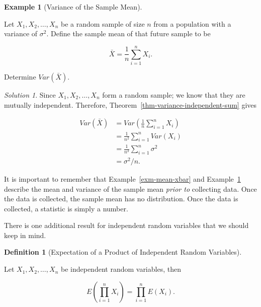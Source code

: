 \documentclass[
  letterpaper,
  DIV=11,
  numbers=noendperiod]{scrreprt}
\theoremstyle{definition}
\newtheorem{definition}{Definition}[chapter]
\theoremstyle{plain}
\theoremstyle{definition}
\newtheorem{example}{Example}[chapter]
\theoremstyle{remark}
\newtheorem*{solution}{Solution}
\begin{document}
\begin{example}[Variance of the Sample
Mean]\protect\hypertarget{exm-var-xbar}{}\label{exm-var-xbar}

Let \(X_1, X_2, \dotsc, X_n\) be a random sample of size \(n\) from a
population with a variance of \(\sigma^2\). Define the sample mean of
that future sample to be

\[\bar{X} = \frac{1}{n} \sum_{i=1}^{n} X_i.\]

Determine \(Var\left(\bar{X}\right)\).

\end{example}

\begin{solution}
Since \(X_1, X_2, \dotsc, X_n\) form a random sample; we know that they
are mutually independent. Therefore,
Theorem~\ref{thm-variance-independent-sum} gives

\[
\begin{aligned}
  Var\left(\bar{X}\right)
    &= Var\left(\frac{1}{n} \sum_{i=1}^{n} X_i\right) \\
    &= \frac{1}{n^2} \sum_{i=1}^{n} Var\left(X_i\right) \\
    &= \frac{1}{n^2} \sum_{i=1}^{n} \sigma^2 \\
    &= \sigma^2 / n.
\end{aligned}
\]
\end{solution}

\begin{tcolorbox}[enhanced jigsaw, breakable, colframe=quarto-callout-warning-color-frame, titlerule=0mm, arc=.35mm, coltitle=black, opacitybacktitle=0.6, leftrule=.75mm, opacityback=0, left=2mm, toprule=.15mm, colbacktitle=quarto-callout-warning-color!10!white, title=\textcolor{quarto-callout-warning-color}{\faExclamationTriangle}\hspace{0.5em}{Warning}, bottomtitle=1mm, toptitle=1mm, rightrule=.15mm, bottomrule=.15mm, colback=white]

It is important to remember that Example~\ref{exm-mean-xbar} and
Example~\ref{exm-var-xbar} describe the mean and variance of the sample
mean \emph{prior to} collecting data. Once the data is collected, the
sample mean has no distribution. Once the data is collected, a statistic
is simply a number.

\end{tcolorbox}

There is one additional result for independent random variables that we
should keep in mind.

\begin{definition}[Expectation of a Product of Independent Random
Variables]\protect\hypertarget{def-product-expectations}{}\label{def-product-expectations}

Let \(X_1, X_2, \dotsc, X_n\) be independent random variables, then

\[E\left(\prod_{i=1}^n X_i\right) = \prod_{i=1}^{n} E\left(X_i\right).\]

\end{definition}
\end{document}
